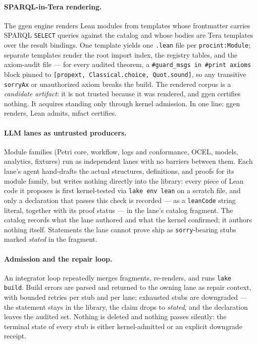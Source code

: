 \documentclass[11pt]{article}
\begin{document}
\paragraph{SPARQL-in-Tera rendering.}
The \textsf{ggen} engine renders Lean modules from templates whose
frontmatter carries SPARQL \texttt{SELECT} queries against the catalog and
whose bodies are Tera templates over the result bindings. One template
yields one \texttt{.lean} file per \texttt{procint:Module}; separate
templates render the root import index, the registry tables, and the
axiom-audit file --- for every audited theorem, a \texttt{\#guard\_msgs in
\#print axioms} block pinned to \texttt{[propext, Classical.choice,
Quot.sound]}, so any transitive \texttt{sorryAx} or unauthorized axiom
breaks the build. The rendered corpus is a \emph{candidate artifact}: it is
not trusted because it was rendered, and \textsf{ggen} certifies nothing.
It acquires standing only through kernel admission. In one line:
\textsf{ggen} renders, Lean admits, \textsf{mfact} certifies.

\paragraph{LLM lanes as untrusted producers.}
Module families (Petri core, workflow, logs and conformance, OCEL,
models, analytics, fixtures) run as independent lanes with no barriers
between them. Each lane's agent hand-drafts the actual structures,
definitions, and proofs for its module family, but writes nothing directly
into the library: every piece of Lean code it proposes is first
kernel-tested via \texttt{lake env lean} on a scratch file, and only a
declaration that passes this check is recorded --- as a \texttt{leanCode}
string literal, together with its proof status --- in the lane's catalog
fragment. The catalog records what the lane authored and what the kernel
confirmed; it authors nothing itself. Statements the lane cannot prove ship
as \texttt{sorry}-bearing stubs marked \emph{stated} in the fragment.

\paragraph{Admission and the repair loop.}
An integrator loop repeatedly merges fragments, re-renders, and runs
\texttt{lake build}. Build errors are parsed and returned to the owning
lane as repair context, with bounded retries per stub and per lane;
exhausted stubs are downgraded --- the statement stays in the library, the
claim drops to \emph{stated}, and the declaration leaves the audited set.
Nothing is deleted and nothing passes silently: the terminal state of every
stub is either kernel-admitted or an explicit downgrade receipt.
\end{document}
